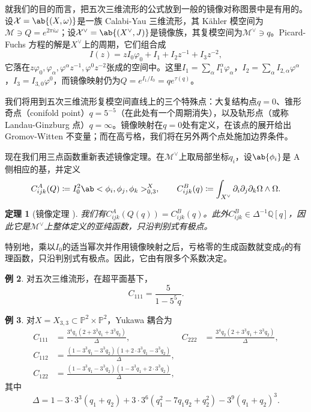 \documentclass{amsart}
\newtheorem{thm}{定理}[section]
\theoremstyle{definition}
\newtheorem{exm}[thm]{例}
\theoremstyle{remark}
\theoremstyle{plain}
\theoremstyle{definition}
\theoremstyle{remark}
\newcommand{\Q}{\mathbb{Q}}
\renewcommand{\P}{\mathbb{P}}
\newcommand{\mc}[1]{\mathcal{#1}}
\newcommand{\1}{\mathbf{1}}
\newcommand{\2}{\mathbf{2}}
\newcommand{\3}{\mathbf{3}}
\begin{document}
就我们的目的而言，把五次三维流形的公式放到一般的镜像对称图景中是有用的。设\(\mc{X} = \ab\{(X,\omega)\}\)是一族 Calabi-Yau 三维流形，其 Kähler 模空间为\(\mc{M} \ni Q = e^{2\pi i \omega}\)；设\(\mc{X}^{\vee} = \ab\{(X^{\vee},J)\}\)是镜像族，其复模空间为\(\mc{M}^{\vee} \ni q\)。Picard-Fuchs 方程的解是\(X^{\vee}\)上的周期，它们组合成
\[ I(z) = zI_0\varphi_0 + I_1 + I_2 z^{-1} + I_3 z^{-2}, \]
它落在\(z\varphi_0, \varphi_{\alpha}, \varphi^{\alpha}z^{-1}, \varphi^0 z^{-2}\)张成的空间中。这里\(I_1 = \sum_{\alpha} I_1^{\alpha}\varphi_{\alpha}\)，\(I_2 = \sum_{\alpha} I_{2,\alpha}\varphi^{\alpha}\)，\(I_3 = I_{3,0}\varphi^0\)，而镜像映射仍为\(Q = e^{I_1/I_0} = qe^{\tau(q)}\)。

我们将用到五次三维流形复模空间直线上的三个特殊点：大复结构点\(q=0\)、锥形奇点（conifold point）\(q = 5^{-5}\)（在此处有一个周期消失），以及轨形点（或称 Landau-Ginzburg 点）\(q = \infty\)。镜像映射在\(q=0\)处有定义，在该点的展开给出 Gromov-Witten 不变量；而在高亏格，我们将在另外两个点处施加边界条件。

现在我们用三点函数重新表述镜像定理。在\(\mc{M}^{\vee}\)上取局部坐标\(q_i\)，设\(\ab\{\phi_i\}\)是 A 侧相应的基，并定义
\[ C^A_{ijk}(Q) \coloneqq I_0^2 \ab<\phi_i, \phi_j, \phi_k>^X_{0,3}, \qquad C^B_{ijk}(q) \coloneqq \int_{X^{\vee}} \partial_i \partial_j \partial_k \Omega \wedge \Omega. \]

\begin{thm}[镜像定理 {\cite{Givental1998,LLY1997}}]
    我们有\(C^A_{ijk}(Q(q)) = C^B_{ijk}(q)\)。此外\(C^B_{ijk} \in \Delta^{-1}\Q[q]\)，因此它是\(\mc{M}^{\vee}\)上整体定义的亚纯函数，只沿判别式有极点。
\end{thm}

特别地，乘以\(I_0\)的适当幂次并作用镜像映射之后，亏格零的生成函数就变成\(q\)的有理函数，只沿判别式有极点。因此，它由有限多个系数决定。

\begin{exm}
    对五次三维流形，在超平面基下，
    \[ C_{111} = \frac{5}{1-5^5 q}. \]
\end{exm}

\begin{exm}
    对\(X = X_{3,3} \subset \P^2 \times \P^2\)，Yukawa 耦合为
    \begin{align*}
        C_{111} &= \frac{3^4 q_1 (2+3^3q_1+3^3q_2)}{\Delta}, & C_{222} &= \frac{3^4 q_2(2+3^3q_1+3^3q_2)}{\Delta}, \\
        C_{112} &= \frac{(1-3^3q_1-3^3q_2)(1+2\cdot 3^3 q_1 - 3^3 q_2)}{\Delta}, \\
        C_{122} &= \frac{(1-3^3q_1-3^3q_2)(1-3^3q_1+2\cdot3^3q_2)}{\Delta},
    \end{align*}
    其中
    \[ \Delta = 1 - 3\cdot3^3(q_1+q_2) + 3\cdot3^6(q_1^2 - 7q_1q_2+q_2^2) - 3^9(q_1+q_2)^3. \]
\end{exm}
\end{document}
